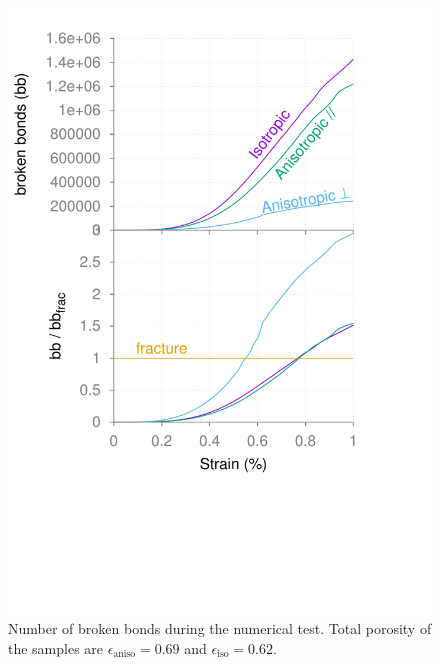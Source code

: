 \documentclass{article}
\begin{document}
	\begin{figure}[ht]
		\centering
		\includegraphics[width=\linewidth]{figures/sup_fig2}
		\caption{Number of broken bonds during the numerical test. Total porosity of the samples are $\epsilon_\text{aniso} = 0.69$ and $\epsilon_\text{iso} = 0.62$.}
	\end{figure}
\end{document}
